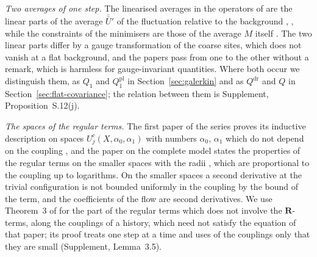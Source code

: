 \documentclass[11pt]{preprint}
\numberwithin{equation}{section}
\theoremstyle{definition}
\theoremstyle{remark}
\theoremstyle{plain}
\begin{document}
\emph{Two averages of one step.} The linearised averages in the operators of \cite{BalabanPBG} are the linear parts of the average $\bar{\bar U}'$ of the fluctuation relative to the background \cite[(3.13), p.~392; (3.113), p.~418]{BalabanPBG}, \cite[(121)--(124), p.~36]{BalabanAVG}, while the constraints of the minimisers are those of the average $M$ itself \cite[(3), p.~278]{BalabanVAR}. The two linear parts differ by a gauge transformation of the coarse sites, which does not vanish at a flat background, and the papers pass from one to the other without a remark, which is harmless for gauge-invariant quantities. Where both occur we distinguish them, as $Q_1$ and $Q^{\mathrm{pl}}_1$ in Section~\ref{sec:galerkin} and as $Q^{\mathrm{dr}}$ and $Q$ in Section~\ref{sec:flat-covariance}; the relation between them is Supplement, Proposition~S.12(j).

\emph{The spaces of the regular terms.} The first paper of the series proves its inductive description on spaces $U^c_j(X, \alpha_0, \alpha_1)$ with numbers $\alpha_0$, $\alpha_1$ which do not depend on the coupling \cite[Theorem~3, p.~264]{BalabanRG1}, and the paper on the complete model states the properties of the regular terms on the smaller spaces with the radii \cite[(2.28), p.~259]{BalabanCRE}, which are proportional to the coupling up to logarithms. On the smaller spaces a second derivative at the trivial configuration is not bounded uniformly in the coupling by the bound of the term, and the coefficients of the flow are second derivatives. We use Theorem~3 of \cite{BalabanRG1} for the part of the regular terms which does not involve the $\mathbf R$-terms, along the couplings of a history, which need not satisfy the equation \cite[(0.20), p.~256]{BalabanRG1} of that paper; its proof treats one step at a time and uses of the couplings only that they are small (Supplement, Lemma~3.5).
\end{document}
